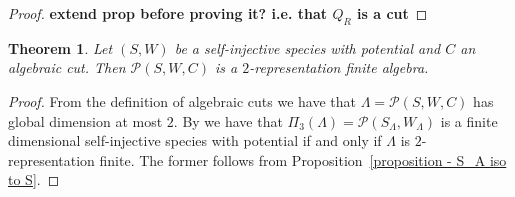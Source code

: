 \documentclass[a4paper, reqno]{amsart}
\newtheorem{mythm}{Theorem}[section]
\theoremstyle{definition}
\begin{document}
\begin{proof}
	\textbf{extend prop before proving it? i.e. that $Q_R$ is a cut}
\end{proof}

\begin{mythm}
	Let $(S, W)$ be a self-injective species with potential and $C$ an algebraic cut. Then $\mathcal{P}(S, W, C)$ is a $2$-representation finite algebra.
\end{mythm}

\begin{proof}
	From the definition of algebraic cuts we have that $\Lambda = \mathcal{P}(S, W, C)$ has global dimension at most $2$. By \cite[Corollary 3.4]{IO13Stablecateofhigherpreproj} we have that $\Pi_3(\Lambda) = \mathcal{P}(S_\Lambda, W_\Lambda)$ is a finite dimensional self-injective species with potential if and only if $\Lambda$ is $2$-representation finite. The former follows from Proposition~\ref{proposition - S_A iso to S}.
\end{proof}
\fi

\clearpage


\end{document}
